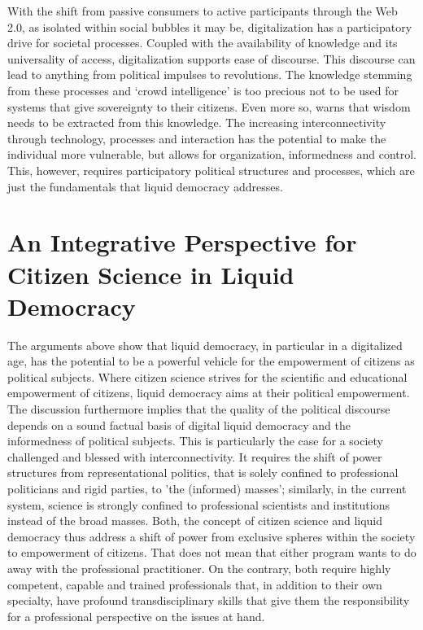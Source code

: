 With the shift from passive consumers to active participants through the Web 2.0, as isolated within social bubbles it may be, digitalization has a participatory drive for societal processes. Coupled with the availability of knowledge and its universality of access, digitalization supports ease of discourse. This discourse can lead to anything from political impulses to revolutions. The knowledge stemming from these processes and `crowd intelligence' is too precious not to be used for systems that give sovereignty to their citizens. Even more so, \textcite{Jonsdottir2015} warns that wisdom needs to be extracted from this knowledge.
The increasing interconnectivity through technology, processes and interaction has the potential to make the individual more vulnerable, but allows for organization, informedness and control. This, however, requires participatory political structures and processes, which are just the fundamentals that liquid democracy addresses.


\section{An Integrative Perspective for Citizen Science in Liquid Democracy}
\label{sec:Integration_CSLD}
The arguments above show that liquid democracy, in particular in a digitalized age, has the potential to be a powerful vehicle for the empowerment of citizens as political subjects. Where citizen science strives for the scientific and educational empowerment of citizens, liquid democracy aims at their political empowerment. The discussion furthermore implies that the quality of the political discourse depends on a sound factual basis of digital liquid democracy and the informedness of political subjects. This is particularly the case for a society challenged and blessed with interconnectivity. It requires the shift of power structures from representational politics, that is solely confined to professional politicians and rigid parties, to 'the (informed) masses'; similarly, in the current system, science is strongly confined to professional scientists and institutions instead of the broad masses. Both, the concept of citizen science and liquid democracy thus address a shift of power from exclusive spheres within the society to empowerment of citizens. That does not mean that either program wants to do away with the professional practitioner. On the contrary, both require highly competent, capable and trained professionals that, in addition to their own specialty, have profound transdisciplinary skills that give them the responsibility for a professional perspective on the issues at hand.


